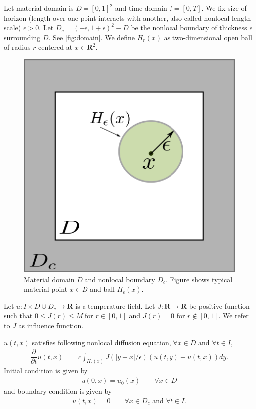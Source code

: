 \documentclass[11pt,twocolumn]{amsart}
\theoremstyle{definition}
\theoremstyle{definition}
\numberwithin{equation}{section}
\numberwithin{equation}{section}
\newcommand{\R}{\mathbf{R}}  %
\begin{document}
Let material domain is $D = [0,1]^2$ and time domain $I = [0,T]$. We fix size of horizon (length over one point interacts with another, also called nonlocal length scale) $\epsilon>0$. Let $D_c = (-\epsilon, 1+\epsilon)^2 - D$ be the nonlocal boundary of thickness $\epsilon$ surrounding $D$. See \autoref{fig:domain}. We define $H_r(x)$ as two-dimensional open ball of radius $r$ centered at $x\in \R^2$.

\begin{figure}
\centering
\includegraphics[scale=0.5]{material_domain.png}
\caption{Material domain $D$ and nonlocal boundary $D_c$. Figure shows typical material point $x\in D$ and ball $H_\epsilon(x)$. }\label{fig:domain}
\end{figure}

Let $u:I \times D\cup D_c \to \R$ is a temperature field. Let $J:\R \to \R$ be positive function such that $0\leq J(r) \leq M$ for $r\in [0,1]$ and $J(r) = 0$ for $r\notin [0,1]$. We refer to $J$ as influence function. 

$u(t,x)$ satisfies following nonlocal diffusion equation, $\forall x\in D \text{ and } \forall t \in I$,
\begin{align}\label{eq:diff eqn}
\dfrac{\partial }{\partial t} u(t,x) &= c \int_{H_\epsilon(x)} J(|y-x|/\epsilon) (u(t,y) - u(t,x)) dy .
\end{align}
Initial condition is given by
\begin{align}\label{eq:ic}
u(0,x) = u_0(x) \qquad \forall x\in D
\end{align}
and boundary condition is given by
\begin{align} \label{eq:bc}
u(t,x) = 0 \qquad \forall x\in D_c \text{ and } \forall t\in I.
\end{align}
\end{document}
